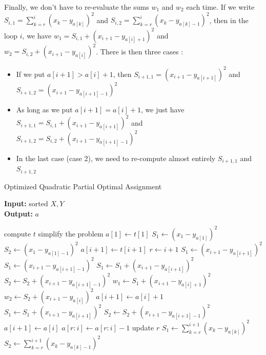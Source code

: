 \documentclass[a4paper,12pt]{article}
\begin{document}
Finally, we don't have to re-evaluate the sums $w_1$ and $w_2$ each time. If we write $S_{i,1} = \sum_{k=r}^{i} (x_k - y_{a[k]})^2$ and $S_{i,2} = \sum_{k=r}^{i} (x_k - y_{a[k]-1})^2$, then in the loop $i$, we have $w_1 = S_{i,1} + (x_{i+1} - y_{a[i]+1})^2$ and $w_2 = S_{i,2} + (x_{i+1} - y_{a[i]})^2$. There is then three cases :
\begin{itemize}
\item If we put $a[i+1]>a[i]+1$, then $S_{i+1,1}=(x_{i+1}-y_{a[i+1]})^2$ and $S_{i+1,2} = (x_{i+1}-y_{a[i+1]-1})^2$
\item As long as we put $a[i+1] = a[i]+1$, we just have $S_{i+1,1} = S_{i,1}+(x_{i+1}-y_{a[i+1]})^2$ and $S_{i+1,2} = S_{i,2}+(x_{i+1}-y_{a[i+1]-1})^2$
\item In the last case (case 2), we need to re-compute almost entirely $S_{i+1,1}$ and $S_{i+1,2}$
\end{itemize}

\begin{algorithm}
\caption{Optimized Quadratic Partial Optimal Assignment}\label{a_quad_opt}
\hspace*{\algorithmicindent} \textbf{Input:} sorted $X,Y$\\
\hspace*{\algorithmicindent} \textbf{Output:} $a$ 
\begin{algorithmic}[1]
\State compute $t$
\State simplify the problem
\State $a[1] \gets t[1]$
\State $S_1 \gets (x_{1} - y_{a[1]})^2$
\State $S_2 \gets (x_{1} - y_{a[1]-1})^2$
		\State $a[i+1] \gets t[i+1]$
			\State $r \gets i+1$
			\State $S_1 \gets (x_{i+1} - y_{a[i+1]})^2$
			\State $S_1 \gets (x_{i+1} - y_{a[i+1]-1})^2$
		\Else {}
        	\State $S_1 \gets S_1 + (x_{i+1} - y_{a[i+1]})^2$
        	\State $S_2 \gets S_2 + (x_{i+1} - y_{a[i+1]-1})^2$			
		\EndIf
    \Else
        \State $w_1 \gets S_1 + (x_{i+1} - y_{a[i]+1})^2$
        \State $w_2 \gets S_2 + (x_{i+1} - y_{a[i]})^2$
         
        	\State $a[i+1] \gets a[i]+1$
        	\State $S_1 \gets S_1 + (x_{i+1} - y_{a[i+1]})^2$
        	\State $S_2 \gets S_2 + (x_{i+1} - y_{a[i+1]-1})^2$
        \Else {}
        	\State $a[i+1] \gets a[i]$
        	\State $a[r:i] \gets a[r:i]-1$
        	\State update $r$
        	\State $S_1 \gets \sum_{k=r}^{i+1} (x_k - y_{a[k]})^2$
        	\State $S_2 \gets \sum_{k=r}^{i+1} (x_k - y_{a[k]-1})^2$
        \EndIf
    \EndIf
\EndFor
\State {}
\end{algorithmic}
\end{algorithm}
\end{document}

